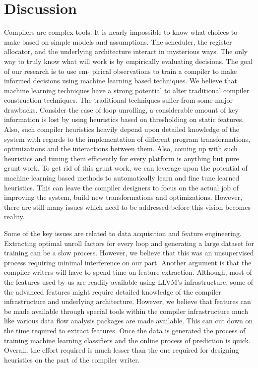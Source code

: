 \documentclass[]{sig-alternate}
\begin{document}
\section{Discussion}
\label{sec:Discussion}
Compilers are complex tools. It is nearly impossible to know what choices to make based on simple models and assumptions. The scheduler, the register allocator, and the underlying architecture interact in mysterious ways. The
only way to truly know what will work is by empirically evaluating decisions. The goal of our research is to use em-
pirical observations to train a compiler to make informed decisions using machine learning based techniques. We believe that machine learning techniques have a strong potential to alter traditional compiler construction techniques. The traditional techniques suffer from some major drawbacks. Consider the case of loop unrolling,  a considerable amount of key information is lost by using heuristics based on thresholding on static features. Also, such compiler heuristics heavily depend upon detailed  knowledge of the system with regards to the implementation of different program transformations, optimizations and the interactions between them. Also, coming up with such heuristics and tuning them efficiently for every platform is anything but pure grunt work. To get rid of this grunt work, we can leverage upon the potential of machine learning based methods to automatically learn and fine tune learned heuristics. This can leave the compiler designers to focus on the actual job of improving the system, build new transformations and optimizations.  However, there are still many issues which need to be addressed before this vision becomes reality. 

Some of the key issues are related to data acquisition and feature engineering. Extracting optimal unroll factors for every loop and generating a large dataset for training can be a  slow process. However, we believe that this was an unsupervised process requiring minimal interference on our part. Another argument is that the compiler writers will have to spend time on feature extraction. Although, most of the features used by us are readily available using LLVM's infrastructure, some of the advanced features might require detailed knowledge of the compiler infrastructure and underlying architecture. However, we believe that features can be made available through special tools within the compiler infrastructure much like various data flow analysis packages are made available. This can cut down on the time required to extract features. Once the data is generated the process of training machine learning classifiers and the online process of prediction is quick. Overall, the effort required is much lesser than the one required for designing heuristics on the part of the compiler writer.  
\end{document}
